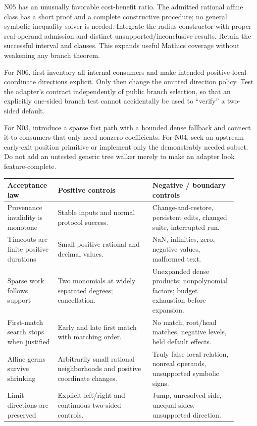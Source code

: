 \documentclass[11pt,a4paper]{article}
\newcommand{\code}[1]{\texttt{\detokenize{#1}}}
\begin{document}
N05 has an unusually favorable cost-benefit ratio. The admitted rational affine
class has a short proof and a complete constructive procedure; no general
symbolic inequality solver is needed. Integrate the radius constructor with
proper real-operand admission and distinct unsupported/inconclusive results.
Retain the successful interval and clauses. This expands useful Mathics
coverage without weakening any branch theorem.

For N06, first inventory all internal \code{Limit} consumers and make intended
positive-local-coordinate directions explicit. Only then change the omitted
direction policy. Test the adapter's contract independently of public branch
selection, so that an explicitly one-sided branch test cannot accidentally be
used to ``verify'' a two-sided default.

For N03, introduce a sparse fast path with a bounded dense fallback and connect
it to consumers that only need nonzero coefficients. For N04, seek an upstream
early-exit position primitive or implement only the demonstrably needed subset.
Do not add an untested generic tree walker merely to make an adapter look
feature-complete.

\begin{longtable}{@{}P{0.20\linewidth}P{0.38\linewidth}P{0.34\linewidth}@{}}
\toprule
Acceptance law & Positive controls & Negative / boundary controls \\
\midrule
\endhead
Provenance invalidity is monotone & Stable inputs and normal protocol success. & Change-and-restore, persistent edits, changed suite, interrupted run. \\
Timeouts are finite positive durations & Small positive rational and decimal values. & NaN, infinities, zero, negative values, malformed text. \\
Sparse work follows support & Two monomials at widely separated degrees; cancellation. & Unexpanded dense products; nonpolynomial factors; budget exhaustion before expansion. \\
First-match search stops when justified & Early and late first match with matching order. & No match, root/head matches, negative levels, held default effects. \\
Affine germs survive shrinking & Arbitrarily small rational neighborhoods and positive coordinate changes. & Truly false local relation, nonreal operands, unsupported symbolic signs. \\
Limit directions are preserved & Explicit left/right and continuous two-sided controls. & Jump, unresolved side, unequal sides, unsupported direction. \\
\bottomrule
\end{longtable}
\end{document}
